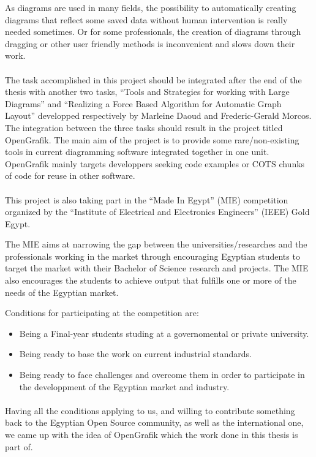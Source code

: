 As diagrams are used in many fields, the possibility to automatically creating diagrams that reflect some saved data without human intervention is really needed sometimes. Or for some professionals, the creation of diagrams through dragging or other user friendly methods is inconvenient and slows down their work.

\paragraph{}
The task accomplished in this project should be integrated after the end of the thesis with another two tasks, ``Tools and Strategies for working with Large Diagrams'' and ``Realizing a Force Based Algorithm for Automatic Graph Layout'' developped respectively by Marleine Daoud and Frederic-Gerald Morcos. The integration between the three tasks should result in the project titled OpenGrafik. The main aim of the project is to provide some rare/non-existing tools in current diagramming software integrated together in one unit. OpenGrafik mainly targets developpers seeking code examples or COTS chunks of code for reuse in other software.

\paragraph{}
This project is also taking part in the ``Made In Egypt'' (MIE) competition organized by the ``Institute of Electrical and Electronics Engineers'' (IEEE) Gold Egypt.

The MIE aims at narrowing the gap between the universities/researches and the professionals working in the market through encouraging Egyptian students to target the market with their Bachelor of Science research and projects. The MIE also encourages the students to achieve output that fulfills one or more of the needs of the Egyptian market.

Conditions for participating at the competition are:
\begin{itemize}
\item Being a Final-year students studing at a governomental or private university.
\item Being ready to base the work on current industrial standards.
\item Being ready to face challenges and overcome them in order to participate in the developpment of the Egyptian market and industry.
\end{itemize}

\paragraph{}
Having all the conditions applying to us, and willing to contribute something back to the Egyptian Open Source community, as well as the international one, we came up with the idea of OpenGrafik which the work done in this thesis is part of.

